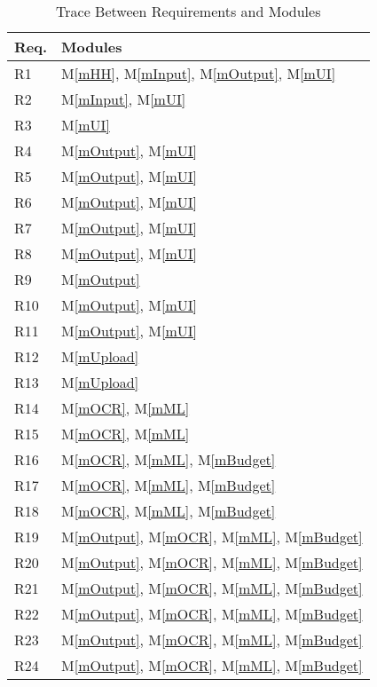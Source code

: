 \documentclass[12pt, titlepage]{article}
\newcommand{\mref}[1]{M\ref{#1}}
\begin{document}
\begin{table}[H]
\centering
\begin{tabular}{p{} p{}}
\toprule
\textbf{Req.} & \textbf{Modules}\\
\midrule
R1 & \mref{mHH}, \mref{mInput}, \mref{mOutput}, \mref{mUI}\\
R2 & \mref{mInput}, \mref{mUI}\\
R3 & \mref{mUI}\\
R4 & \mref{mOutput}, \mref{mUI}\\
R5 & \mref{mOutput}, \mref{mUI}\\
R6 & \mref{mOutput}, \mref{mUI}\\
R7 & \mref{mOutput}, \mref{mUI}\\
R8 & \mref{mOutput}, \mref{mUI}\\
R9 & \mref{mOutput}\\
R10 & \mref{mOutput}, \mref{mUI}\\
R11 & \mref{mOutput}, \mref{mUI}\\
R12 & \mref{mUpload}\\
R13 & \mref{mUpload}\\
R14 & \mref{mOCR}, \mref{mML}\\
R15 & \mref{mOCR}, \mref{mML}\\
R16 & \mref{mOCR}, \mref{mML}, \mref{mBudget}\\
R17 & \mref{mOCR}, \mref{mML}, \mref{mBudget}\\
R18 & \mref{mOCR}, \mref{mML}, \mref{mBudget}\\
R19 & \mref{mOutput}, \mref{mOCR}, \mref{mML}, \mref{mBudget}\\
R20 & \mref{mOutput}, \mref{mOCR}, \mref{mML}, \mref{mBudget}\\
R21 & \mref{mOutput}, \mref{mOCR}, \mref{mML}, \mref{mBudget}\\
R22 & \mref{mOutput}, \mref{mOCR}, \mref{mML}, \mref{mBudget}\\
R23 & \mref{mOutput}, \mref{mOCR}, \mref{mML}, \mref{mBudget}\\
R24 & \mref{mOutput}, \mref{mOCR}, \mref{mML}, \mref{mBudget}\\

\bottomrule
\end{tabular}
\caption{Trace Between Requirements and Modules}
\label{TblRT}
\end{table}
\end{document}
